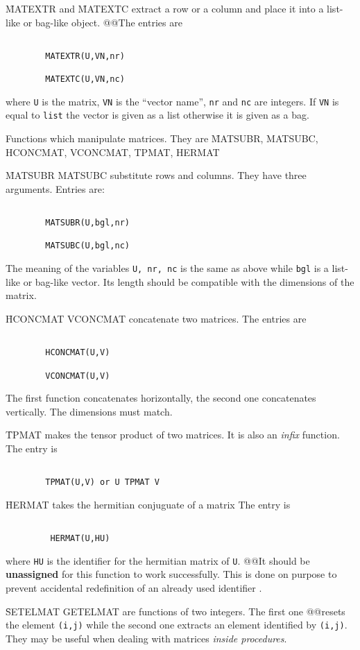 \f{MATEXTR} and \f{MATEXTC} extract a row or a column and place it into
a list-like or bag-like object.
@@The entries are
\begin{verbatim}

        MATEXTR(U,VN,nr)

        MATEXTC(U,VN,nc)

\end{verbatim}
where \verb+U+ is the matrix,  \verb+VN+ is the ``vector name'',
\verb+nr+  and \verb+nc+ are integers.  If \verb+VN+  is equal
to {\tt list} the vector  is given  as a list otherwise  it is
given as a bag.
\item[iii.]
Functions which manipulate matrices. They are
\f{MATSUBR, MATSUBC, HCONCMAT, VCONCMAT, TPMAT, HERMAT}

\f{MATSUBR MATSUBC} substitute rows and columns. They have three arguments.
Entries are:
\begin{verbatim}

        MATSUBR(U,bgl,nr)

        MATSUBC(U,bgl,nc)

\end{verbatim}
The meaning of the variables \verb+U, nr, nc+ is the same as above
while \verb+bgl+ is a list-like or bag-like vector.
Its  length should be compatible with the dimensions of the matrix.

\f{HCONCMAT VCONCMAT} concatenate two matrices. The entries are
\begin{verbatim}

        HCONCMAT(U,V)

        VCONCMAT(U,V)

\end{verbatim}
The  first   function  concatenates  horizontally,   the   second  one
concatenates vertically. The dimensions must match.

\f{TPMAT} makes the tensor product of two matrices. It is also an
{\em infix} function. The entry is
\begin{verbatim}

        TPMAT(U,V) or U TPMAT V

\end{verbatim}
\f{HERMAT} takes the hermitian conjuguate of a matrix
The entry is
\begin{verbatim}

         HERMAT(U,HU)

\end{verbatim}
where \verb+HU+ is the identifier for the hermitian matrix of \verb+U+.
@@It should be {\bf unassigned} for this function to work  successfully.
This is done on  purpose to prevent accidental redefinition of an already
used identifier .
\item[iv.]
\f{SETELMAT GETELMAT} are functions of two integers. The first one
@@resets the element \verb+(i,j)+ while the second one extracts an
element identified by \verb+(i,j)+. They may be useful when
dealing with matrices {\em inside procedures}.
\ei

